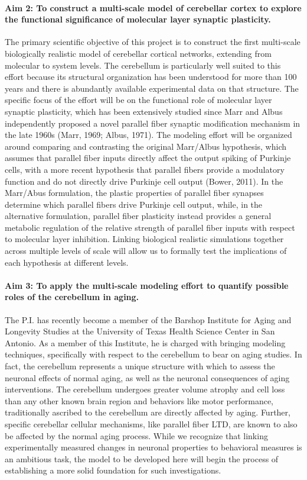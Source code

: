 \documentclass[12pt]{article}
\begin{document}
\paragraph{Aim 2: To construct a multi-scale model of cerebellar cortex to explore the functional significance of molecular layer synaptic plasticity.} The primary scientific objective of this project is to construct the first multi-scale biologically realistic model of cerebellar cortical networks, extending from molecular to system levels. The cerebellum is particularly well suited to this effort because its structural organization has been understood for more than 100 years and there is abundantly available experimental data on that structure. The specific focus of the effort will be on the functional role of molecular layer synaptic plasticity, which has been extensively studied since Marr and Albus independently proposed a novel parallel fiber synaptic modification mechanism in the late 1960s (Marr, 1969; Albus, 1971). The modeling effort will be organized around comparing and contrasting the original Marr/Albus hypothesis, which assumes that parallel fiber inputs directly affect the output spiking of Purkinje cells, with a more recent hypothesis that parallel fibers provide a modulatory function and do not directly drive Purkinje cell output (Bower, 2011). In the Marr/Abus formulation, the plastic properties of parallel fiber synapses determine which parallel fibers drive Purkinje cell output, while, in the alternative formulation, parallel fiber plasticity instead provides a general metabolic regulation of the relative strength of parallel fiber inputs with respect to molecular layer inhibition. Linking biological realistic simulations together across multiple levels of scale will allow us to formally test the implications of each hypothesis at different levels.

\paragraph{Aim 3: To apply the multi-scale modeling effort to quantify possible roles of the cerebellum in aging.} The P.I. has recently become a member of the Barshop Institute for Aging and Longevity Studies at the University of Texas Health Science Center in San Antonio. As a member of this Institute, he is charged with bringing modeling techniques, specifically with respect to the cerebellum to bear on aging studies. In fact, the cerebellum represents a unique structure with which to assess the neuronal effects of normal aging, as well as the neuronal consequences of aging interventions. The cerebellum undergoes greater volume atrophy and cell loss than any other known brain region and behaviors like motor performance, traditionally ascribed to the cerebellum are directly affected by aging. Further, specific cerebellar cellular mechanisms, like parallel fiber LTD, are known to also be affected by the normal aging process. While we recognize that linking experimentally measured changes in neuronal properties to behavioral measures is an ambitious task, the model to be developed here will begin the process of establishing a more solid foundation for such investigations.
\end{document}
